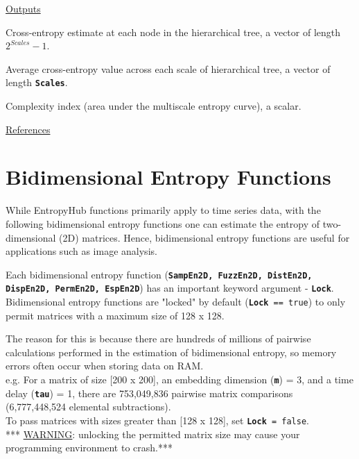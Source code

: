 \documentclass[12pt, a4paper, titlepage, openany]{book}
\begin{document}
\noindent \ul{Outputs}
\begin{description}[labelsep=1cm, labelwidth=2cm, nosep, style=multiline,leftmargin=3cm]\footnotesize
\item[\texttt{MSx}]		Cross-entropy estimate at each node in the hierarchical tree, a vector of length $2^{Scales}-1$.
\item[\texttt{Sn}]		Average cross-entropy value across each scale of hierarchical tree, a vector of length \texttt{\textbf{Scales}}.
\item[\texttt{Ci}]		Complexity index (area under the multiscale entropy curve), a scalar.
\end{description}

\noindent \ul{References}\hspace{1cm}
\cite{hMS1} 



\newpage
\section{Bidimensional Entropy Functions}
\vspace{3em}
\normalsize
While EntropyHub functions primarily apply to time series data, with the following bidimensional entropy functions one can estimate the entropy of two-dimensional (2D) matrices. Hence, bidimensional entropy functions are useful for applications such as image analysis. \\

\begin{tcolorbox}[sharp corners, colback=ehone!30, colframe=ehone, title=\hypertarget{bidinote}{\textbf{IMPORTANT NOTE}}, label={BiBox}]
Each bidimensional entropy function (\texttt{\textbf{SampEn2D, FuzzEn2D, DistEn2D, DispEn2D, PermEn2D, EspEn2D}}) has an important keyword argument - \texttt{\textbf{Lock}}. Bidimensional entropy functions are "locked" by default (\texttt{\textbf{Lock} == true}) to only permit matrices with a maximum size of 128 x 128.\\ \newline

The reason for this is because there are hundreds of millions of pairwise calculations performed in the estimation of bidimensional entropy, so memory errors often occur when storing data on RAM.\\
e.g. For a matrix of size [200 x 200], an embedding dimension (\texttt{\textbf{m}}) = 3, and a time delay (\texttt{\textbf{tau}}) = 1, there are 753,049,836 pairwise matrix comparisons (6,777,448,524 elemental subtractions).\\ \newline
To pass matrices with sizes greater than [128 x 128], set \texttt{\textbf{Lock} = false}.\\ \newline
*** \ul{WARNING}: unlocking the permitted matrix size may cause your programming environment to crash.***\\
\end{tcolorbox}
\end{document}
